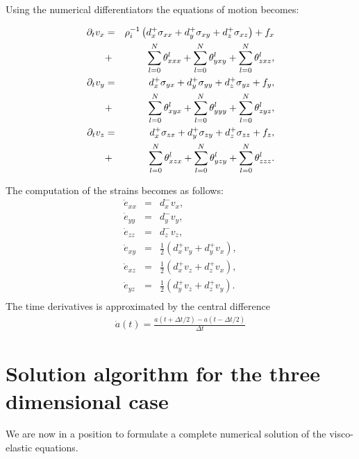 \documentclass[11pt]{article}
\begin{document}
{Using the numerical differentiators the equations of motion becomes:

\begin{eqnarray}
  \partial_t{v}_x & = & \rho^{-1}_i\left(d^+_x \sigma_{xx} +d^+_y \sigma_{xy} +d^+_z \sigma_{xz}\right) + f_x \\
           & + & \sum_{l=0}^N\theta^l_{xxx} +  \sum_{l=0}^N\theta^l_{yxy} +  \sum_{l=0}^N\theta^l_{zxz}, \\ 
  \partial_t{v}_y & = & d^+_x \sigma_{yx} +d^+_y \sigma_{yy} +d^+_z \sigma_{yz} + f_y, \\
           & + & \sum_{l=0}^N\theta^l_{xyx} +  \sum_{l=0}^N\theta^l_{yyy} +  \sum_{l=0}^N\theta^l_{zyz}, \\ 
  \partial_t{v}_z & = & d^+_x \sigma_{zx} +d^+_y \sigma_{zy} +d^+_z \sigma_{zz} + f_z, \\
           & + & \sum_{l=0}^N\theta^l_{xzx} +  \sum_{l=0}^N\theta^l_{yzy} +  \sum_{l=0}^N\theta^l_{zzz}.
                      \label{eq:vel-discrete}
\end{eqnarray}

The computation of the strains becomes as follows:
\begin{eqnarray}
    \dot{e}_{xx} & = & d^-_x v_x, \nonumber \\
    \dot{e}_{yy} & = & d^-_y v_y, \nonumber \\
    \dot{e}_{zz} & = & d^-_z v_z, \nonumber \\
    \dot{e}_{xy} & = & \frac{1}{2}(d^+_x v_y + d^+_y v_x),\nonumber\\
    \dot{e}_{xz} & = & \frac{1}{2}(d^+_x v_z + d^+_z v_x),\nonumber\\
    \dot{e}_{yz} & = & \frac{1}{2}(d^+_y v_z +d^+_z v_y).\nonumber\\
                \label{eq:strains}
\end{eqnarray}
The time derivatives is approximated by the central difference
\begin{eqnarray}
\dot{a}(t) = \frac{a(t+\Delta t/2) - a(t-\Delta t/2)}{\Delta t}
                      \label{eq:time-derivative}
\end{eqnarray}

\section*{Solution algorithm for the three dimensional case}
We are now in a position to formulate a complete numerical 
solution of the visco-elastic equations.

}
\end{document}
